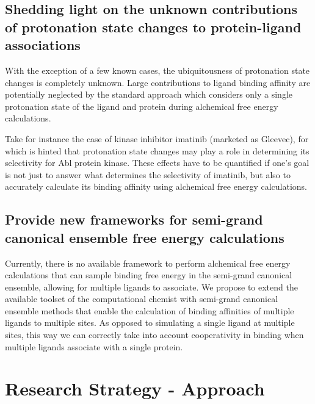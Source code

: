 \documentclass[10pt,final]{article}
\newif\ifinstr
\newcommand{\instr}[1]{\ifdraft{\ifinstr {\color{cyan}\emph{#1}} \fi}{}}
\begin{document}
\subsection*{Shedding light on the unknown contributions of protonation state changes to protein-ligand associations}
With the exception of a few known cases\cite{Aleksandrov2007a,Czodrowski2007a}, the ubiquitousness of protonation state changes is completely unknown. Large contributions to ligand binding affinity are potentially neglected by the standard approach which considers only a single protonation state of the ligand and protein during alchemical free energy calculations.

Take for instance the case of kinase inhibitor imatinib (marketed as Gleevec), for which is hinted that protonation state changes may play a role in determining its selectivity for Abl protein kinase\cite{Lin2013a}. These effects have to be quantified if one's goal is not just to answer what determines the selectivity of imatinib, but also to accurately calculate its binding affinity using alchemical free energy calculations.

\subsection*{Provide new frameworks for semi-grand canonical ensemble free energy calculations}
Currently, there is no available framework to perform alchemical free energy calculations that can sample binding free energy in the semi-grand canonical ensemble, allowing for multiple ligands to associate. We propose to extend the available toolset of the computational chemist with semi-grand canonical ensemble methods that enable the calculation of binding affinities of multiple ligands to multiple sites. As opposed to simulating a single ligand at multiple sites, this way we can correctly take into account cooperativity in binding when multiple ligands associate with a single protein.


\section*{Research Strategy - Approach}
\instr{Approach: More specific background information. Describe in detail the experimental design and research methods to be used. Technical hurdles to be overcome should be mentioned. Alternative approaches should be given for experiments that may not be feasible. Discussion of expected or possible results and their interpretation. Best format for each specific aim: a) rationale, b) methods, c) expected results, d) alternatives. Theory aims should follow a similar structure where possible.}
\end{document}
